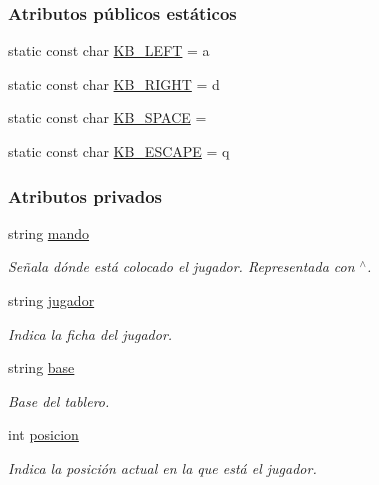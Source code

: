 \subsubsection*{Atributos públicos estáticos}
\begin{DoxyCompactItemize}
\item 
static const char \hyperlink{classMando_a61277e93015f5d44d37416f1475be542}{K\+B\+\_\+\+L\+E\+FT} = \textquotesingle{}a\textquotesingle{}
\item 
static const char \hyperlink{classMando_a75b32aa31a64931f62c5737b8f09bf39}{K\+B\+\_\+\+R\+I\+G\+HT} = \textquotesingle{}d\textquotesingle{}
\item 
static const char \hyperlink{classMando_ade68606cf2abf043c08e281d1531c78a}{K\+B\+\_\+\+S\+P\+A\+CE} = \textquotesingle{} \textquotesingle{}
\item 
static const char \hyperlink{classMando_a3c4e7465d5b25fcaf8f3b50b444421a3}{K\+B\+\_\+\+E\+S\+C\+A\+PE} = \textquotesingle{}q\textquotesingle{}
\end{DoxyCompactItemize}
\subsubsection*{Atributos privados}
\begin{DoxyCompactItemize}
\item 
string \hyperlink{classMando_a156e71bce6ea523dccbce03021bee4dd}{mando}
\begin{DoxyCompactList}\small\item\em Señala dónde está colocado el jugador. Representada con \textquotesingle{}$^\wedge$\textquotesingle{}. \end{DoxyCompactList}\item 
string \hyperlink{classMando_ab4791c4f5bb306c1bbcf95047e010163}{jugador}
\begin{DoxyCompactList}\small\item\em Indica la ficha del jugador. \end{DoxyCompactList}\item 
string \hyperlink{classMando_ad914a93d7fb6c085a26d5d70bbb7fecd}{base}
\begin{DoxyCompactList}\small\item\em Base del tablero. \end{DoxyCompactList}\item 
int \hyperlink{classMando_a7971a6eaa8b936977be7460ffa28530f}{posicion}
\begin{DoxyCompactList}\small\item\em Indica la posición actual en la que está el jugador. \end{DoxyCompactList}\end{DoxyCompactItemize}



